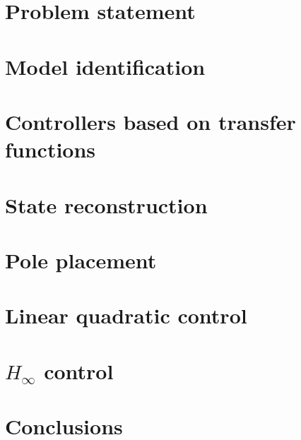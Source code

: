 \documentclass{report}
\begin{document}
\chapter{Problem statement}
	
\chapter{Model identification}
	
\chapter{Controllers based on transfer functions}
\chapter{State reconstruction}
	
\chapter{Pole placement}
	
\chapter{Linear quadratic control}
	
\chapter{\boldmath ${H_{\infty}}$ control}
	
\chapter{Conclusions}
	
\end{document}
